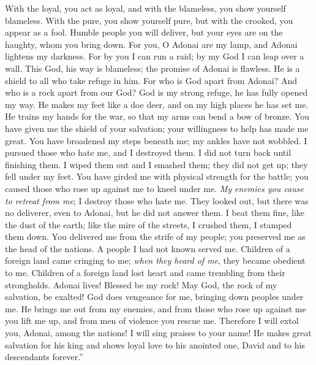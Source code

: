 \begin{biblechapter}
\verse With the loyal, you act as loyal, 
and with the blameless, you show yourself blameless.
\verse With the pure, you show yourself pure, 
but with the crooked, you appear as a fool.
\verse Humble people you will deliver, 
but your eyes are on the haughty, whom you bring down.
\verse For you, O Adonai are my lamp, 
and Adonai lightens my darkness.
\verse For by you I can run a raid; 
by my God I can leap over a wall.
\verse This God, his way is blameless; 
the promise of Adonai is flawless. 
He is a shield to all who take refuge in him.
\verse For who is God apart from Adonai? 
And who is a rock apart from our God?
\verse God is my strong refuge, 
he has fully opened my way.
\verse He makes my feet like a doe deer, 
and on my high places he has set me.
\verse He trains my hands for the war, 
so that my arms can bend a bow of bronze.
\verse You have given me the shield of your salvation; 
your willingness to help has made me great.
\verse You have broadened my steps beneath me; 
my ankles have not wobbled.
\verse I pursued those who hate me, and I destroyed them. 
I did not turn back until finishing them.
\verse I wiped them out and I smashed them; 
they did not get up; they fell under my feet.
\verse You have girded me with physical strength for the battle; 
you caused those who rose up against me to kneel under me.
\verse \textit{My enemies you cause to retreat from me}; 
I destroy those who hate me.
\verse They looked out, but there was no deliverer, 
even to Adonai, but he did not answer them.
\verse I beat them fine, like the dust of the earth; 
like the mire of the streets, I crushed them, I stamped them down.
\verse You delivered me from the strife of my people; 
you preserved me as the head of the nations. 
A people I had not known served me.
\verse Children of a foreign land came cringing to me; 
\textit{when they heard of me}, they became obedient to me.
\verse Children of a foreign land lost heart 
and came trembling from their strongholds.
\verse Adonai lives! Blessed be my rock! 
May God, the rock of my salvation, be exalted!
\verse God does vengeance for me, 
bringing down peoples under me.
\verse He brings me out from my enemies, 
and from those who rose up against me you lift me up, 
and from men of violence you rescue me.
\verse Therefore I will extol you, Adonai, among the nations! 
I will sing praises to your name!
\verse He makes great salvation for his king 
and shows loyal love to his anointed one, David 
and to his descendants forever.”
\end{biblechapter}

